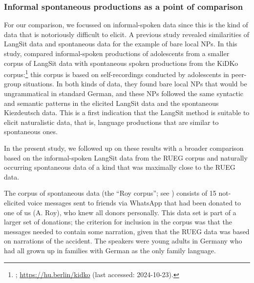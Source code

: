 \documentclass[output=paper,colorlinks,citecolor=brown]{langscibook}
\begin{document}
\subsubsection{Informal spontaneous productions as a point of comparison} \label{ch1:sec:3.2.1}

For our comparison, we focussed on informal-spoken data since this is the kind of data that is notoriously difficult to elicit. A previous study revealed similarities of LangSit data and spontaneous data for the example of bare local NPs. In this study, \citet{wiesepohle2016} compared informal-spoken productions of adolescents from a smaller corpus of LangSit data with spontaneous spoken productions from the KiDKo corpus:\footnote{\cite{wiese2012}; \url{https://hu.berlin/kidko} (last accessed: 2024-10-23).} this corpus is based on self-recordings conducted by adolescents in peer-group situations. In both kinds of data, they found bare local NPs that would be ungrammatical in standard German, and these NPs followed the same syntactic and semantic patterns in the elicited LangSit data and the spontaneous Kiezdeutsch data. This is a first indication that the LangSit method is suitable to elicit naturalistic data, that is, language productions that are similar to spontaneous ones.

In the present study, we followed up on these results with a broader comparison based on the informal-spoken LangSit data from the RUEG corpus and naturally occurring spontaneous data of a kind that was maximally close to the RUEG data.

The corpus of spontaneous data (the “Roy corpus”; see \cite{roy2022}) consists of 15 not-elicited voice messages sent to friends via WhatsApp that had been donated to one of us (A. Roy), who knew all donors personally. This data set is part of a larger set of donations; the criterion for inclusion in the corpus was that the messages needed to contain some narration, given that the RUEG data was based on narrations of the accident. The speakers were young adults in Germany who had all grown up in families with German as the only family language.
\end{document}
